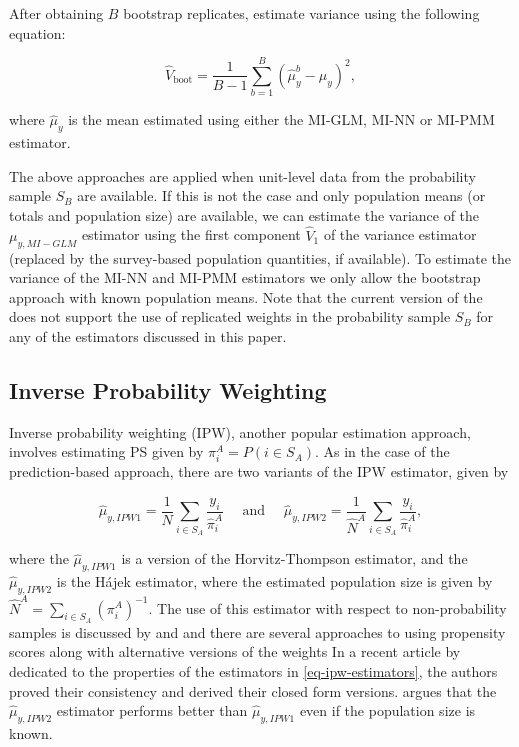 \documentclass[
]{jss}
\begin{document}
After obtaining \(B\) bootstrap replicates, estimate variance using the
following equation:

\begin{equation}
\hat{V}_{\text{boot}} = \frac{1}{B-1}\sum_{b=1}^B\left(\hat{\mu}^b_y - \hat{\mu}_y\right)^2,
\label{eq-var-bootstrap}
\end{equation}

where \(\hat{\mu}_y\) is the mean estimated using either the MI-GLM,
MI-NN or MI-PMM estimator.

The above approaches are applied when unit-level data from the
probability sample \(S_B\) are available. If this is not the case and
only population means (or totals and population size) are available, we
can estimate the variance of the \(\mu_{y,MI-GLM}\) estimator using the
first component \(\hat{V}_1\) of the \citet{kim_combining_2021} variance
estimator (replaced by the survey-based population quantities, if
available). To estimate the variance of the MI-NN and MI-PMM estimators
we only allow the bootstrap approach with known population means. Note
that the current version of the  does not support the
use of replicated weights in the probability sample \(S_B\) for any of
the estimators discussed in this paper.

\subsection{Inverse Probability Weighting}\label{sec-ipw}

Inverse probability weighting (IPW), another popular estimation
approach, involves estimating PS given by
\(\pi_i^A=P\left(i \in S_A \right)\). As in the case of the
prediction-based approach, there are two variants of the IPW estimator,
given by

\begin{equation}
\hat{\mu}_{y,IPW1}=\frac{1}{N} \sum_{i \in S_A} \frac{y_i}{\hat{\pi}_i^A} \quad \text { and } \quad \hat{\mu}_{y,IPW2}=\frac{1}{\hat{N}^A} \sum_{i \in S_A} \frac{y_i}{\hat{\pi}_i^A},
\label{eq-ipw-estimators}
\end{equation}

where the \(\hat{\mu}_{y,IPW1}\) is a version of the Horvitz-Thompson
estimator, and the \(\hat{\mu}_{y,IPW2}\) is the Hájek estimator, where
the estimated population size is given by
\(\hat{N}^A = \sum_{i \in S_A} (\pi_i^A)^{-1}\). The use of this
estimator with respect to non-probability samples is discussed by
\citet{lee2006propensity} and
\citet[chapter 13]{biffignandi2021handbook} and there are several
approaches to using propensity scores along with alternative versions of
the weights \citep[cf.][section 3]{elliott_inference_2017} In a recent
article by \citet{chen2020doubly} dedicated to the properties of the
estimators in \eqref{eq-ipw-estimators}, the authors proved their
consistency and derived their closed form versions.
\citet[section 4.2]{wu2022statistical} argues that the
\(\hat{\mu}_{y,IPW2}\) estimator performs better than
\(\hat{\mu}_{y,IPW1}\) even if the population size is known.
\end{document}
